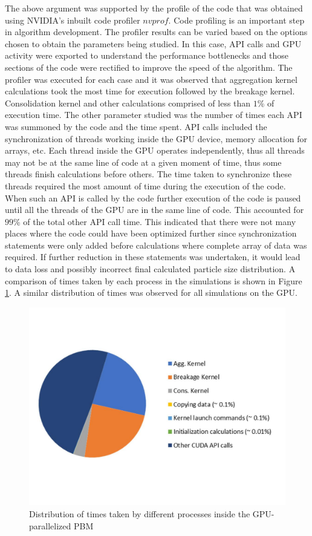 \documentclass[preprint,10pt,authoryear,review]{elsarticle}
\begin{document}
The above argument was supported by the profile of the code that was obtained using NVIDIA's
inbuilt code profiler $nvprof$. Code profiling is an important step in algorithm development. 
The profiler results can be varied based on the options chosen to obtain the parameters being 
studied. In this case, API calls and GPU activity were exported to understand the performance 
bottlenecks and those sections of the code were rectified to improve the speed of the algorithm.
The profiler was executed for each case and it was observed that aggregation kernel calculations 
took the most time for execution followed by the breakage kernel. Consolidation kernel 
and other calculations comprised of less than $1$\% of execution time. The other parameter 
studied was the number of times each API was summoned by the code and the time spent. API 
calls included the synchronization of threads working inside the GPU device, memory allocation 
for arrays, etc. Each thread inside the GPU operates independently,
thus all threads may not be at the same line of code at a given moment of time, thus some threads 
finish calculations before others. The time taken to synchronize these threads required the most 
amount of time during the execution of the code. When such an API is called by the code 
further execution of the code is paused until all the threads of the GPU are in the same 
line of code. This accounted for $99$\% of the total other API call time. This indicated that there 
were not many places where the code could have been optimized further since synchronization 
statements were only added before calculations where complete array of data was required. 
If further reduction in these statements was undertaken, it would lead to data loss and 
possibly incorrect final calculated particle size distribution. A comparison of times taken 
by each process in the simulations is shown in Figure \ref{fig:res_profile_pie}. A similar 
distribution of times was observed for all simulations on the GPU.

\begin{figure}[h]
\centering
\includegraphics[scale=0.4]{Profile_Pie-converted.pdf}
\caption{Distribution of times taken by different processes inside the GPU-parallelized 
PBM}
\label{fig:res_profile_pie}
\end{figure}
\end{document}
